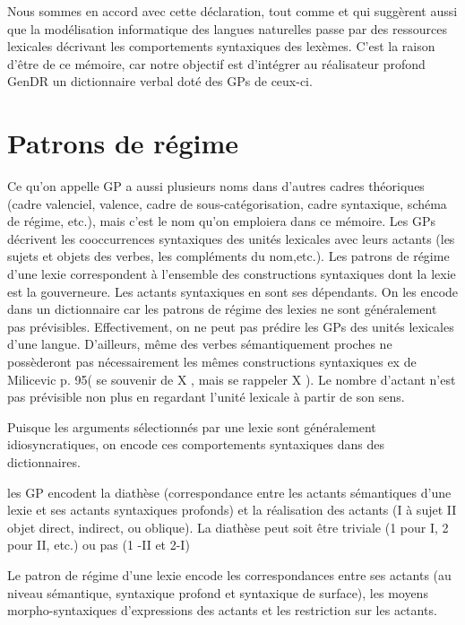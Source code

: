 Nous sommes en accord avec cette déclaration, tout comme \cite{Korhonenlargesubcategorizationlexicon2006} et \cite{MESSIANT08.142} qui suggèrent aussi que la modélisation informatique des langues naturelles passe par des ressources lexicales décrivant les comportements syntaxiques des lexèmes.  C'est la raison d'être de ce mémoire, car notre objectif est d'intégrer au réalisateur profond GenDR  un dictionnaire verbal doté des \acp{GP} de ceux-ci.

\section{Patrons de régime}\label{sec:gp}

Ce qu'on appelle \ac{GP} a aussi plusieurs noms dans d'autres cadres théoriques (cadre valenciel, valence, cadre de sous-catégorisation, cadre syntaxique, schéma de régime, etc.), mais c'est le nom qu'on emploiera dans ce mémoire. Les \acp{GP} décrivent les cooccurrences syntaxiques des unités lexicales \citep{MilicevicSchemaregimepont2009} avec leurs actants (les sujets et objets des verbes, les compléments du nom,etc.). Les patrons de régime d'une lexie correspondent à l'ensemble des constructions syntaxiques dont la lexie est la gouverneure. Les actants syntaxiques en sont ses dépendants. On les encode dans un dictionnaire car les patrons de régime des lexies ne sont généralement pas prévisibles. Effectivement, on ne peut pas prédire les \acp{GP} des unités lexicales d'une langue. D'ailleurs, même des verbes sémantiquement proches ne possèderont pas nécessairement les mêmes constructions syntaxiques ex de Milicevic p. 95( se souvenir de X , mais se rappeler X ). Le nombre d'actant n'est pas prévisible non plus en regardant l'unité lexicale à partir de son sens. 

Puisque les arguments sélectionnés par une lexie sont généralement idiosyncratiques, on encode ces comportements syntaxiques dans des dictionnaires.

les GP encodent la diathèse (correspondance entre les actants sémantiques d'une lexie et ses actants syntaxiques profonds) et la réalisation des actants (I à sujet II objet direct, indirect, ou oblique). La diathèse peut soit être triviale (1 pour I, 2 pour II, etc.) ou pas (1 -II et 2-I)

Le patron de régime d'une lexie encode les correspondances entre ses actants (au niveau sémantique, syntaxique profond et syntaxique de surface), les moyens morpho-syntaxiques d'expressions des actants et les restriction sur les actants.

